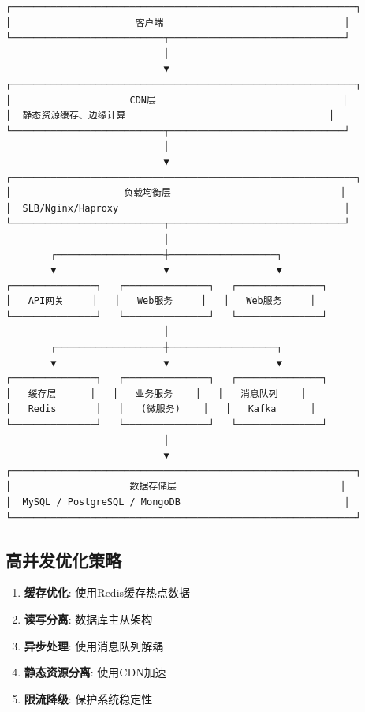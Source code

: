 \documentclass[12pt,UTF8]{ctexbook}
\begin{document}
\begin{lstlisting}
┌─────────────────────────────────────────────────────────────┐
│                      客户端                                │
└───────────────────────────┬───────────────────────────────┘
                            │
                            ▼
┌─────────────────────────────────────────────────────────────┐
│                     CDN层                                 │
│  静态资源缓存、边缘计算                                    │
└───────────────────────────┬───────────────────────────────┘
                            │
                            ▼
┌─────────────────────────────────────────────────────────────┐
│                    负载均衡层                              │
│  SLB/Nginx/Haproxy                                        │
└───────────────────────────┬───────────────────────────────┘
                            │
        ┌───────────────────┼───────────────────┐
        ▼                   ▼                   ▼
┌───────────────┐   ┌───────────────┐   ┌───────────────┐
│   API网关     │   │   Web服务     │   │   Web服务     │
└───────────────┘   └───────────────┘   └───────────────┘
                            │
        ┌───────────────────┼───────────────────┐
        ▼                   ▼                   ▼
┌───────────────┐   ┌───────────────┐   ┌───────────────┐
│   缓存层      │   │   业务服务    │   │   消息队列    │
│   Redis       │   │   (微服务)    │   │   Kafka      │
└───────────────┘   └───────────────┘   └───────────────┘
                            │
                            ▼
┌─────────────────────────────────────────────────────────────┐
│                     数据存储层                             │
│  MySQL / PostgreSQL / MongoDB                             │
└─────────────────────────────────────────────────────────────┘
\end{lstlisting}

\subsection{高并发优化策略}

\begin{enumerate}
    \item \textbf{缓存优化}: 使用Redis缓存热点数据
    \item \textbf{读写分离}: 数据库主从架构
    \item \textbf{异步处理}: 使用消息队列解耦
    \item \textbf{静态资源分离}: 使用CDN加速
    \item \textbf{限流降级}: 保护系统稳定性
\end{enumerate}
\end{document}
